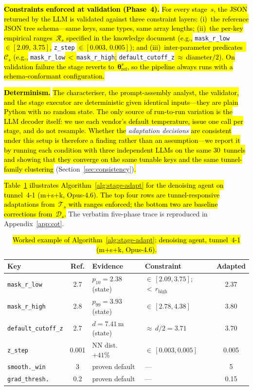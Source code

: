 \documentclass[a4paper,fleqn]{cas-dc}
\begin{document}
{\hl{\textbf{Constraints enforced at validation (Phase~4).}} \hl{For every stage~$s$, the JSON returned by the LLM is validated against three constraint layers: (i)~the reference JSON tree schema---same keys, same types, same array lengths; (ii)~the per-key empirical ranges~$\mathcal{R}_s$ specified in the knowledge document (e.g.,} \mbox{\texttt{mask\_r\_low}} \hl{$\in [2.09,\,3.75]$,} \mbox{\texttt{z\_step}} \hl{$\in [0.003,\,0.005]$); and (iii)~inter-parameter predicates~$\mathcal{C}_s$ (e.g.,} \mbox{\texttt{mask\_r\_low}}\hl{\,$<$\,}\mbox{\texttt{mask\_r\_high}}\hl{;} \mbox{\texttt{default\_cutoff\_z}}\hl{\,$\approx$\,diameter$/2$). On validation failure the stage reverts to~$\boldsymbol{\theta}_{\mathrm{ref}}^{s}$, so the pipeline always runs with a schema-conformant configuration.}

\hl{\textbf{Determinism.}} \hl{The characteriser, the prompt-assembly analyst, the validator, and the stage executor are deterministic given identical inputs---they are plain Python with no random state. The only source of run-to-run variation is the LLM decoder itself: we use each vendor's default temperature, issue one call per stage, and do not resample. Whether the} \emph{adaptation decisions} \hl{are consistent under this setup is therefore a finding rather than an assumption---we report it by running each condition with three independent LLMs on the same 30~tunnels and showing that they converge on the same tunable keys and the same tunnel-family clustering} (Section~\ref{sec:consistency})\hl{.}

\hl{Table~\mbox{\ref{tab:cot-inline}} illustrates Algorithm~\mbox{\ref{alg:stage-adapt}} for the denoising agent on tunnel~4-1 (m+s+k, Opus-4.6). The top four rows are tunnel-responsive adaptations from~$\mathcal{T}_s$ with ranges enforced; the bottom two are baseline corrections from~$\mathcal{D}_s$.} The verbatim five-phase trace is reproduced in Appendix~\ref{app:cot}.

\begin{table}[ht]
\caption{\hl{Worked example of Algorithm~\mbox{\ref{alg:stage-adapt}}: denoising agent, tunnel~4-1 (m+s+k, Opus-4.6).}}\label{tab:cot-inline}
\begin{tabular*}{\tblwidth}{@{} l c l l c @{}}
\toprule
Key & Ref. & Evidence & Constraint & Adapted \\
\midrule
\texttt{mask\_r\_low} & 2.7 & $p_{10}\!=\!2.38$ (state) & ${\in}\,[2.09,3.75]$; ${<}\,r_{\mathrm{high}}$ & 2.37 \\
\texttt{mask\_r\_high} & 2.8 & $p_{99}\!=\!3.93$ (state) & ${\in}\,[2.78,4.38]$ & 3.80 \\
\texttt{default\_cutoff\_z} & 2.7 & $d\!=\!7.41$\,m (state) & ${\approx}\,d/2\!=\!3.71$ & 3.70 \\
\texttt{z\_step} & 0.001 & NN dist.\ ${+}41\%$ & ${\in}\,[0.003,0.005]$ & 0.005 \\
\midrule
\texttt{smooth.\_win} & 3 & proven default & --- & 5 \\
\texttt{grad\_thresh.} & 0.2 & proven default & --- & 0.15 \\
\bottomrule
\end{tabular*}
\end{table}

}
\end{document}
